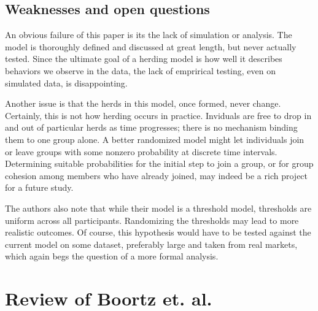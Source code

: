 \documentclass{article}
\begin{document}
\subsection{Weaknesses and open questions}
An obvious failure of this paper is its the lack of simulation or analysis.
The model is thoroughly defined and discussed at great length, but never actually tested. 
Since the ultimate goal of a herding model is how well it describes behaviors we observe in the data, the lack of emprirical testing, even on simulated data, is disappointing.

Another issue is that the herds in this model, once formed, never change. 
Certainly, this is not how herding occurs in practice. 
Inviduals are free to drop in and out of particular herds as time progresses; there is no mechanism binding them to one group alone.
A better randomized model might let individuals join or leave groups with some nonzero probability at discrete time intervals.
Determining suitable probabilities for the initial step to join a group, or for group cohesion among members who have already joined, may indeed be a rich project for a future study.

The authors also note that while their model is a threshold model, thresholds are uniform across all participants. 
Randomizing the thresholds may lead to more realistic outcomes. 
Of course, this hypothesis would have to be tested against the current model on some dataset, preferably large and taken from real markets, which again begs the question of a more formal analysis.

\section{Review of Boortz et. al.}
\end{document}
